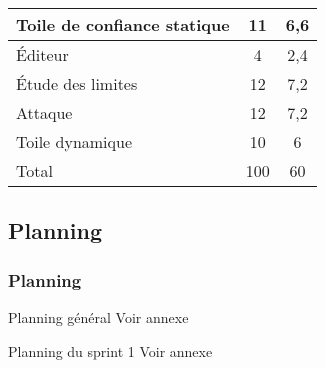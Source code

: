 \begin{frame}
\begin{tabular}{|l|l|l|}
    \hline
    \cellcolor{orange}\color{white}Toile de confiance statique & \multicolumn{1}{|c|}{\cellcolor{orange}\color{white}11} & \multicolumn{1}{|c|}{\cellcolor{orange}\color{white}6,6} \\
    \hline
    \cellcolor{orange}\color{white}\'{E}diteur & \multicolumn{1}{|c|}{\cellcolor{orange}\color{white}4} & \multicolumn{1}{|c|}{\cellcolor{orange}\color{white}2,4} \\
    \hline
    \cellcolor{vert}\color{white}\'{E}tude des limites & \multicolumn{1}{|c|}{\cellcolor{vert}\color{white}12} & \multicolumn{1}{|c|}{\cellcolor{vert}\color{white}7,2} \\
    \hline
    \cellcolor{vert}\color{white}Attaque & \multicolumn{1}{|c|}{\cellcolor{vert}\color{white}12} & \multicolumn{1}{|c|}{\cellcolor{vert}\color{white}7,2} \\
    \hline
    \cellcolor{vert}\color{white}Toile dynamique & \multicolumn{1}{|c|}{\cellcolor{vert}\color{white}10} & \multicolumn{1}{|c|}{\cellcolor{vert}\color{white}6} \\
    \hline
    Total & \multicolumn{1}{|c|}{100} & \multicolumn{1}{|c|}{60} \\
    \hline
  \end{tabular}
\end{frame}
\subsection{Planning}
\begin{frame}
  \frametitle{\color{white} Planning}
  \begin{block}{Planning général}
	Voir annexe
  \end{block}
  \begin{block}{Planning du sprint 1}
	Voir annexe
  \end{block}
\end{frame}
